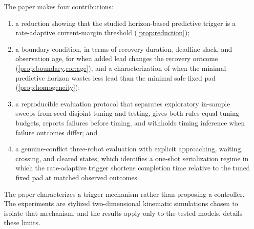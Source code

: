 The paper makes four contributions:
\begin{enumerate}
  \item a reduction showing that the studied horizon-based predictive trigger is
    a rate-adaptive current-margin threshold (\cref{prop:reduction});
  \item a boundary condition, in terms of recovery duration, deadline slack, and
    observation age, for when added lead changes the recovery outcome
    (\cref{prop:boundary,cor:age}), and a characterization of when the minimal
    predictive horizon wastes less lead than the minimal safe fixed pad
    (\cref{prop:homogeneity});
  \item a reproducible evaluation protocol that separates exploratory in-sample
    sweeps from seed-disjoint tuning and testing, gives both rules equal tuning
    budgets, reports failures before timing, and withholds timing inference when
    failure outcomes differ; and
  \item a genuine-conflict three-robot evaluation with explicit approaching,
    waiting, crossing, and cleared states, which identifies a one-shot
    serialization regime in which the rate-adaptive trigger shortens completion
    time relative to the tuned fixed pad at matched observed outcomes.
\end{enumerate}

The paper characterizes a trigger mechanism rather than proposing a controller.
The experiments are stylized two-dimensional kinematic simulations chosen to
isolate that mechanism, and the results apply only to the tested models.
 details these limits.
